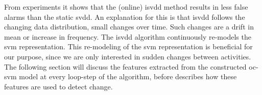 From experiments it shows that the (online) \gls{isvdd} method results in less false alarms than the static \gls{svdd}.
An explanation for this is that \gls{isvdd} follows the changing data distribution, \ie small changes over time.
Such changes are a drift in mean or increase in frequency.
The \gls{isvdd} algorithm continuously re-models the \gls{svm} representation.
This re-modeling of the \gls{svm} representation is beneficial for our purpose, since we are only interested in sudden changes between activities.
The following section will discuss the features extracted from the constructed \gls{oc-svm} model at every loop-step of the algorithm, before  describes how these features are used to detect change.